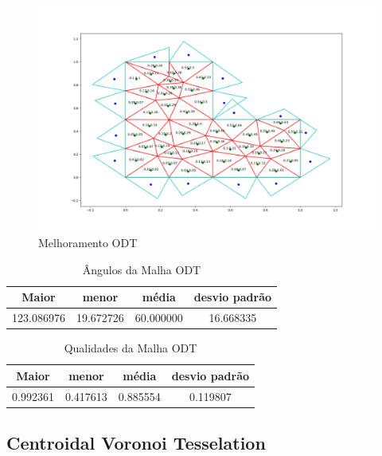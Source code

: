 \begin{figure}[ht]
    \centering
    \includegraphics[width=1\linewidth]{fig/malha-odt.png}
    \caption{Melhoramento ODT}
    \label{fig:malha-odt}
\end{figure}

\begin{table}[hb]
\centering
\par\caption{Ângulos da Malha ODT}
\begin{tabular}{c|c|c|c}
Maior&menor&média&desvio padrão\\\hline\hline
123.086976&19.672726&60.000000&16.668335\\\hline
\end{tabular}
\label{tab:angulos-malha-odt}
\end{table}

\begin{table}[hb]
\centering
\par\caption{Qualidades da Malha ODT}
\begin{tabular}{c|c|c|c}
Maior&menor&média&desvio padrão\\\hline\hline
0.992361&0.417613&0.885554&0.119807\\\hline
\end{tabular}
\label{tab:qualidades-malha-odt}
\end{table}

\newpage
\subsection{Centroidal Voronoi Tesselation}

